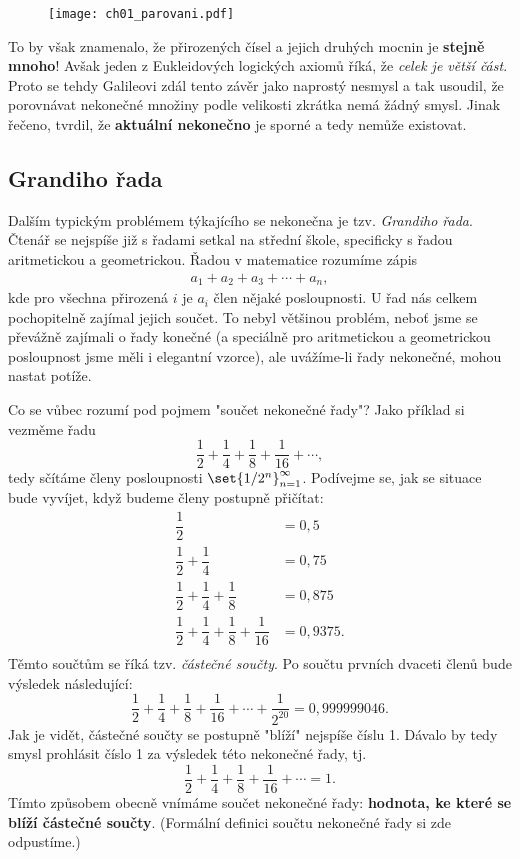 \begin{figure}[h]
	\centering
	\texttt{[image: ch01\_parovani.pdf]}
\end{figure}

To by však znamenalo, že přirozených čísel a jejich druhých mocnin je \textbf{stejně mnoho}! Avšak jeden z Eukleidových logických axiomů říká, že \emph{celek je větší část}. Proto se tehdy Galileovi zdál tento závěr jako naprostý nesmysl a tak usoudil, že porovnávat nekonečné množiny podle velikosti zkrátka nemá žádný smysl. Jinak řečeno, tvrdil, že \textbf{aktuální nekonečno} je sporné a tedy nemůže existovat. \cite{Fuchs2003}%

\subsection{Grandiho řada}

Dalším typickým problémem týkajícího se nekonečna je tzv. \emph{Grandiho řada}. Čtenář se nejspíše již s řadami setkal na střední škole, specificky s řadou aritmetickou a geometrickou. Řadou v matematice rozumíme zápis
\begin{align*}
a_1+a_2+a_3+\cdots+a_n,
\end{align*}
kde pro všechna přirozená $i$ je $a_i$ člen nějaké posloupnosti. U řad nás celkem pochopitelně zajímal jejich součet. To nebyl většinou problém, neboť jsme se převážně zajímali o řady konečné (a speciálně pro aritmetickou a geometrickou posloupnost jsme měli i elegantní vzorce), ale uvážíme-li řady nekonečné, mohou nastat potíže.\par
Co se vůbec rozumí pod pojmem "součet nekonečné řady"? Jako příklad si vezměme řadu
\begin{equation*}
	\dfrac{1}{2}+\dfrac{1}{4}+\dfrac{1}{8}+\dfrac{1}{16}+\cdots,
\end{equation*}
tedy sčítáme členy posloupnosti $\set{1/2^n}_{n=1}^{\infty}$. Podívejme se, jak se situace bude vyvíjet, když budeme členy postupně přičítat:
\begin{align*}
	\dfrac{1}{2}&=0{,}5\\
	\dfrac{1}{2}+\dfrac{1}{4}&=0{,}75\\
	\dfrac{1}{2}+\dfrac{1}{4}+\dfrac{1}{8}&=0{,}875\\
	\dfrac{1}{2}+\dfrac{1}{4}+\dfrac{1}{8}+\dfrac{1}{16}&=0{,}9375.\\
\end{align*}
Těmto součtům se říká tzv. \emph{částečné součty}. Po součtu prvních dvaceti členů bude výsledek následující:
\begin{equation*}
	\dfrac{1}{2}+\dfrac{1}{4}+\dfrac{1}{8}+\dfrac{1}{16}+\cdots+\dfrac{1}{2^{20}}=0{,}999999046.
\end{equation*}
Jak je vidět, částečné součty se postupně "blíží" nejspíše číslu 1. Dávalo by tedy smysl prohlásit číslo 1 za výsledek této nekonečné řady, tj.
\begin{equation*}
	\dfrac{1}{2}+\dfrac{1}{4}+\dfrac{1}{8}+\dfrac{1}{16}+\cdots=1.
\end{equation*}
Tímto způsobem obecně vnímáme součet nekonečné řady: \textbf{hodnota, ke které se blíží částečné součty}. (Formální definici součtu nekonečné řady si zde odpustíme.)
\medskip

